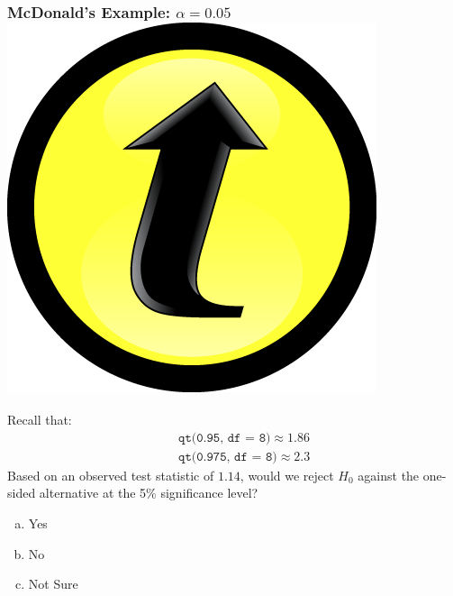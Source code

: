 \documentclass[handout]{beamer}
\begin{document}
\begin{frame}[t]
\frametitle{McDonald's Example: $\alpha = 0.05$\hfill \includegraphics[scale = 0.05]{./images/clicker}}
Recall that:
\begin{eqnarray*}
		&&\texttt{qt(0.95, df  = 8)}\approx 1.86\\
		 &&\texttt{qt(0.975, df  = 8)}\approx 2.3
	\end{eqnarray*}
Based on an observed test statistic of $1.14$, would we reject $H_0$ against the one-sided alternative at the 5\% significance level?
\begin{enumerate}[(a)]
	\item Yes
	\item No
	\item Not Sure
\end{enumerate}

\end{frame}
\end{document}

